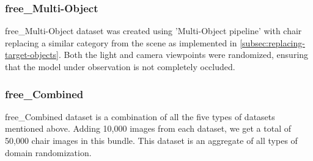 \subsubsection{\gls{free}\_Multi-Object}

\gls{free}\_Multi-Object dataset was created using 'Multi-Object pipeline' with chair replacing a similar category from the scene as implemented in \autoref{subsec:replacing-target-objects}.
Both the light and camera viewpoints were randomized, ensuring that the model under observation is not completely occluded.

\subsubsection{\gls{free}\_Combined}
\gls{free}\_Combined dataset is a combination of all the five types of datasets mentioned above.
Adding 10,000 images from each dataset, we get a total of 50,000 chair images in this bundle.
This dataset is an aggregate of all types of domain randomization.





